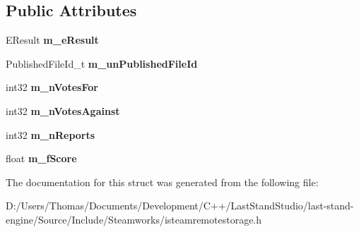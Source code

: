 \subsection*{Public Attributes}
\begin{DoxyCompactItemize}
\item 
\hypertarget{structRemoteStorageGetPublishedItemVoteDetailsResult__t_abd77e7b08b7fccc40dd4b1061aa38946}{}E\+Result {\bfseries m\+\_\+e\+Result}\label{structRemoteStorageGetPublishedItemVoteDetailsResult__t_abd77e7b08b7fccc40dd4b1061aa38946}

\item 
\hypertarget{structRemoteStorageGetPublishedItemVoteDetailsResult__t_a18cfe1187e147823fbe54f9541fad92c}{}Published\+File\+Id\+\_\+t {\bfseries m\+\_\+un\+Published\+File\+Id}\label{structRemoteStorageGetPublishedItemVoteDetailsResult__t_a18cfe1187e147823fbe54f9541fad92c}

\item 
\hypertarget{structRemoteStorageGetPublishedItemVoteDetailsResult__t_a4563c2c0f7e711786eb3d2645b2d3fb3}{}int32 {\bfseries m\+\_\+n\+Votes\+For}\label{structRemoteStorageGetPublishedItemVoteDetailsResult__t_a4563c2c0f7e711786eb3d2645b2d3fb3}

\item 
\hypertarget{structRemoteStorageGetPublishedItemVoteDetailsResult__t_a9a894ccdc8058f59e426923590e1d9ec}{}int32 {\bfseries m\+\_\+n\+Votes\+Against}\label{structRemoteStorageGetPublishedItemVoteDetailsResult__t_a9a894ccdc8058f59e426923590e1d9ec}

\item 
\hypertarget{structRemoteStorageGetPublishedItemVoteDetailsResult__t_a8654d404f11f7c6b635748332b066763}{}int32 {\bfseries m\+\_\+n\+Reports}\label{structRemoteStorageGetPublishedItemVoteDetailsResult__t_a8654d404f11f7c6b635748332b066763}

\item 
\hypertarget{structRemoteStorageGetPublishedItemVoteDetailsResult__t_a58e4a5cadb84f2a43ceb85c1fc405b0e}{}float {\bfseries m\+\_\+f\+Score}\label{structRemoteStorageGetPublishedItemVoteDetailsResult__t_a58e4a5cadb84f2a43ceb85c1fc405b0e}

\end{DoxyCompactItemize}


The documentation for this struct was generated from the following file\+:\begin{DoxyCompactItemize}
\item 
D\+:/\+Users/\+Thomas/\+Documents/\+Development/\+C++/\+Last\+Stand\+Studio/last-\/stand-\/engine/\+Source/\+Include/\+Steamworks/isteamremotestorage.\+h\end{DoxyCompactItemize}
